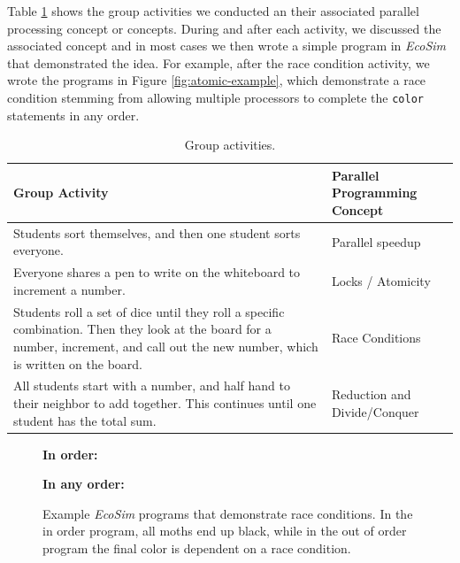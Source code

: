 \documentclass{sig-alternate}
\newcommand{\INDSTATE}[1][1]{\STATE\hspace{#1\algorithmicindent}}
\begin{document}
Table \ref{tab:group-activities} shows the group activities we conducted an their associated
parallel processing concept or concepts.  During and after each activity, we discussed the
associated concept and in most cases we then wrote a simple program in \emph{EcoSim} that
demonstrated the idea.
For example, after the race condition activity, we wrote the programs in Figure 
\ref{fig:atomic-example}, which demonstrate a race condition stemming from allowing multiple
processors to complete the \texttt{color} statements in any order.

\begin{table}
\centering \begin{tabular}{p{11cm} | p{5cm}} 
\toprule
Group Activity               &  Parallel Programming Concept \\ \midrule
Students sort themselves, and then one student sorts everyone.     & Parallel speedup \\ \hline
Everyone shares a pen to write on the whiteboard to increment a number. & Locks / Atomicity  \\ \hline
Students roll a set of dice until they roll a specific combination.  Then they
look at the board for a number, increment, and call out the new number, which is
written on the board.  & Race Conditions \\ \hline
All students start with a number, and half hand to their neighbor to add together.
This continues until one student has the total sum. & Reduction and Divide/Conquer  \\
\bottomrule 
\end{tabular}
\caption{Group activities.}
\label{tab:group-activities}
\end{table} 
     
\begin{figure}
\begin{algorithmic}[1]
\item[{\bf In order:}]
  \INDSTATE{a position}
  \INDSTATE{a color}
\STATE{}
  \INDSTATE{do in order}
  \INDSTATE[2]{replace the moth's color with gray}
  \INDSTATE[2]{replace the moth's color with black}

\item[{\bf In any order:}]
  \INDSTATE{a position}
  \INDSTATE{a color}
\STATE{}
  \INDSTATE{do in any order}
  \INDSTATE[2]{replace the moth's color with gray}
  \INDSTATE[2]{replace the moth's color with black}
\end{algorithmic} 
\caption{Example \emph{EcoSim} programs that demonstrate race conditions.  In the
in order program, all moths end up black, while in the out of order program
the final color is dependent on a race condition.}
\label{fig:raceConditions} 
\end{figure}
\end{document}
